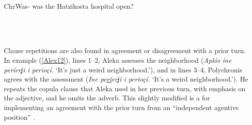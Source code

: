 \documentclass[output=paper]{LSP/langsci}
\begin{document}
\begin{Transcript}[FS {>}{>\hspace{0.1in}}]{Chr}{Was- was the Hatzikosta hospital open?}
\label{Alex11}
\\
      \\  
\\ 
 \\    
\end{Transcript}

Clause repetitions are also found in agreement or disagreement with a prior turn. In example (\ref{Alex12}), lines 1--2, Aleka assesses the neighborhood (\textit{Αplós íne períerʝi i perioçí.} `It’s just a weird neighborhood.'), and in lines 3--4, Polychronis agrees with the assessment (\textit{Ine pe\underline{rí}erʝi i perioçí.} `It’s a weird neighborhood.'). He repeats the copula clause that Aleka used in her previous turn, with emphasis on the adjective, and he omits the adverb. This slightly modified  is a  for implementing an agreement with the prior turn from an ``independent agentive position'' \citep[][285]{Thompson15}.  
\end{document}
